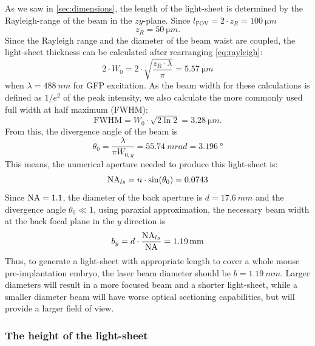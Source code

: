       As we saw in \autoref{sec:dimensions}, the length of the light-sheet is determined by the Rayleigh-range of the beam in the $zy$-plane. Since $l_{\mathrm{FOV}}=2\cdot z_{R}=\SI{100}{\micro m}$
      \begin{equation}
        z_{R}=\SI{50}{\micro m}.
      \end{equation}
      Since the Rayleigh range and the diameter of the beam waist are coupled, the light-sheet thickness can be calculated after rearranging \autoref{eq:rayleigh}:
      \begin{equation}
        2\cdot W_{0} = 2\cdot \sqrt{\frac{z_R \cdot \lambda}{\pi}} = \SI{5.57}{\micro m}
      \end{equation}
      when $\lambda=\SI{488}{nm}$ for GFP excitation. As the beam width for these calculations is defined as $1/e^2$ of the peak intensity, we also calculate the more commonly used full width at half maximum (FWHM):
      \begin{equation}
        \mathrm{FWHM} = W_0 \cdot \sqrt{2 \ln 2} = \SI{3.28}{\micro m}.
      \end{equation}      
      From this, the divergence angle of the beam is
      \begin{equation}
        \theta_0 = \frac{\lambda}{\pi W_{0,y}} = \SI{55.74}{mrad} = \SI{3.196}{\degree}
      \end{equation}
      This means, the numerical aperture needed to produce this light-sheet is:
      \begin{equation}
        \operatorname{NA}_{ls} = n\cdot \sin(\theta _0) = 0.0743
      \end{equation}
      Since $\operatorname{NA}=1.1$, the diameter of the back aperture is $d=\SI{17.6}{mm}$ and the divergence angle $\theta_0 \ll 1$, using paraxial approximation, the necessary beam width at the back focal plane in the $y$ direction is
      \begin{equation}
        b_y = d \cdot \frac{\operatorname{NA}_{ls}}{\operatorname{NA}} = \SI{1.19}{mm}
      \end{equation}
      Thus, to generate a light-sheet with appropriate length to cover a whole mouse pre-implantation embryo, the laser beam diameter should be $b=\SI{1.19}{mm}$. Larger diameters will result in a more focused beam and a shorter light-sheet, while a smaller diameter beam will have worse optical sectioning capabilities, but will provide a larger field of view.

    \subsubsection{The height of the light-sheet}
    

